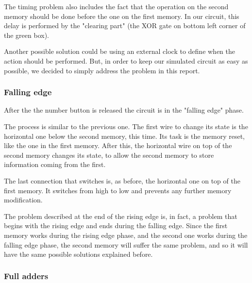 \documentclass{article}
\begin{document}
\vspace{3mm}

The timing problem also includes the fact that the operation on the second memory should be done before the one on the first memory. In our circuit, this delay is performed by the "clearing part" (the XOR gate on bottom left corner of the green box). 

\vspace{3mm}

Another possible solution could be using an external clock to define when the action should be performed. But, in order to keep our simulated circuit as easy as possible, we decided to simply address the problem in this report.




\subsubsection{Falling edge}

After the the number button is released the circuit is in the "falling edge" phase.

\vspace{3mm}

The process is similar to the previous one. The first wire to change its state is the horizontal one below the second memory, this time. Its task is the memory reset, like the one in the first memory. After this, the horizontal wire on top of the second memory changes its state, to allow the second memory to store information coming from the first.

\vspace{3mm}

The last connection that switches is, as before, the horizontal one on top of the first memory. It switches from high to low and prevents any further memory modification.

\vspace{3mm}

The problem described at the end of the rising edge is, in fact, a problem that begins with the rising edge and ends during the falling edge. Since the first memory works during the rising edge phase, and the second one works during the falling edge phase, the second memory will suffer the same problem, and so it will have the same possible solutions explained before.


\subsubsection{Full adders}
\end{document}
